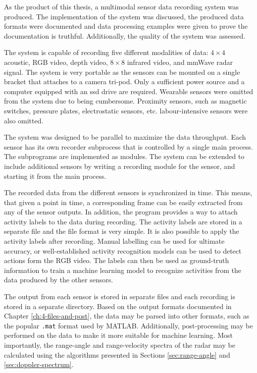 As the product of this thesis,
a multimodal sensor data recording system was produced.
The implementation of the system was discussed,
the produced data formats were documented and data processing examples were given to prove the documentation is truthful.
Additionally, the quality of the system was assessed.

The system is capable of recording five different modalities of data:
$4 \times 4$ acoustic, RGB video, depth video, $8 \times 8$ infrared video, and mmWave radar signal.
The system is very portable as the sensors can be mounted on a single bracket that attaches to a camera tri-pod.
Only a sufficient power source and a computer equipped with an \gls{ssd} drive are required.
Wearable sensors were omitted from the system due to being cumbersome.
Proximity sensors, such as magnetic switches, pressure plates, electrostatic sensors, etc. labour-intensive sensors were also omitted.

The system was designed to be parallel to maximize the data throughput.
Each sensor has its own recorder subprocess that is controlled by a single main process.
The subprograms are implemented as modules.
The system can be extended to include additional sensors by writing a recording module for the sensor,
and starting it from the main process.

The recorded data from the different sensors is synchronized in time.
This means, that given a point in time, a corresponding frame can be easily extracted from any of the sensor outputs.
In addition, the program provides a way to attach activity labels to the data during recording.
The activity labels are stored in a separate file and the file format is very simple.
It is also possible to apply the activity labels after recording.
Manual labelling can be used for ultimate accuracy, or well-established activity recognition models can be used to detect actions form the RGB video.
The labels can then be used as ground-truth information to train a machine learning model to recognize activities from the data produced by the other sensors.

The output from each sensor is stored in separate files and each recording is stored in a separate directory.
Based on the output formats documented in Chapter \ref{ch:4-files-and-post},
the data may be parsed into other formats, such as the popular \texttt{.mat} format used by MATLAB.
Additionally, post-processing may be performed on the data to make it more suitable for machine learning.
Most importantly, the range-angle and range-velocity spectra of the radar may be calculated
using the algorithms presented in Sections \ref{sec:range-angle} and \ref{sec:doppler-spectrum}.


